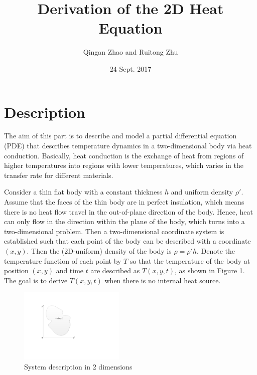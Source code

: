 \documentclass[11pt]{article}
\title{Derivation of the 2D Heat Equation}
\date{24 Sept. 2017}
\author{Qingan Zhao and Ruitong Zhu}
\begin{document}
\maketitle
\newcommand{\ud}{\mathrm d} %
\renewcommand\theequation{\arabic{equation}}
\renewcommand{\figurename}{Fig.}

\section{Description}
The aim of this part is to describe and model a partial differential equation (PDE) that describes temperature dynamics in a two-dimensional body via heat conduction.
Basically, heat conduction is the exchange of heat from regions of higher temperatures into regions with lower temperatures, which varies in the transfer rate for different materials.

Consider a thin flat body with a constant thickness $h$ and uniform density $\rho'$. Assume that the faces of the thin body are in perfect insulation, which means there is no heat flow travel in the out-of-plane direction of the body. Hence, heat can only flow in the direction within the plane of the body, which turns into a two-dimensional problem. Then a two-dimensional coordinate system is established such that each point of the body can be described with a coordinate $(x,y)$. Then the (2D-uniform) density of the body is $\rho = \rho' h$. Denote the temperature function of each point by $T$ so that the temperature of the body at position $(x,y)$ and time $t$ are described as $T(x,y,t)$, as shown in Figure 1. The goal is to derive $T(x,y,t)$ when there is no internal heat source.

\begin{figure}[htb]
	\centering
	\includegraphics[width=5cm]{fig1.pdf}       
	\caption{System description in 2 dimensions}\label{heatElement.fig}
\end{figure}
\end{document}
